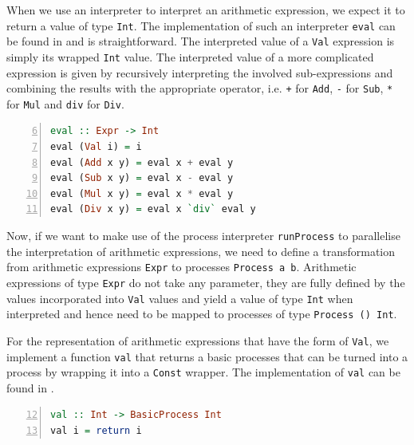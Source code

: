 When we use an interpreter to interpret an arithmetic expression, we expect it to return a value of type \texttt{Int}. The implementation of such an interpreter \texttt{eval} can be found in  and is straightforward. The interpreted value of a \texttt{Val} expression is simply its wrapped \texttt{Int} value. The interpreted value of a more complicated expression is given by recursively interpreting the involved sub-expressions and combining the results with the appropriate operator, i.e. \texttt{+} for \texttt{Add}, \texttt{-} for \texttt{Sub}, \texttt{*} for \texttt{Mul} and \texttt{div} for \texttt{Div}.
\begin{lstlisting}[language=Haskell, caption=Implementation of an interpreter for arithmetic expressions of type \texttt{Expr}., label=lst:arith_eval, numbers=left, frame=bt, firstnumber=6]
eval :: Expr -> Int
eval (Val i) = i
eval (Add x y) = eval x + eval y
eval (Sub x y) = eval x - eval y
eval (Mul x y) = eval x * eval y
eval (Div x y) = eval x `div` eval y
\end{lstlisting}

Now, if we want to make use of the process interpreter \texttt{runProcess} to parallelise the interpretation of arithmetic expressions, we need to define a transformation from arithmetic expressions \texttt{Expr} to processes \texttt{Process a b}. Arithmetic expressions of type \texttt{Expr} do not take any parameter, they are fully defined by the values incorporated into \texttt{Val} values and yield a value of type \texttt{Int} when interpreted and hence need to be mapped to processes of type \texttt{Process () Int}.

For the representation of arithmetic expressions that have the form of \texttt{Val}, we implement a function \texttt{val} that returns a basic processes that can be turned into a process by wrapping it into a \texttt{Const} wrapper. The implementation of \texttt{val} can be found in .
\begin{lstlisting}[language=Haskell, caption=A function that generates basic processes for the representation of \texttt{Val} nodes., label=lst:arith_val, numbers=left, frame=bt, firstnumber=12]
val :: Int -> BasicProcess Int
val i = return i
\end{lstlisting}

